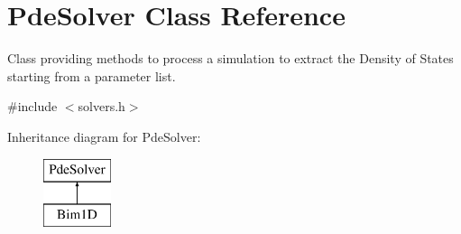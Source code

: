 \hypertarget{classPdeSolver}{\section{Pde\-Solver Class Reference}
\label{classPdeSolver}
}


Class providing methods to process a simulation to extract the Density of States starting from a parameter list.  




{\ttfamily \#include $<$solvers.\-h$>$}

Inheritance diagram for Pde\-Solver\-:\begin{figure}[H]
\begin{center}
\leavevmode
\includegraphics[height=2.000000cm]{classPdeSolver}
\end{center}
\end{figure}
